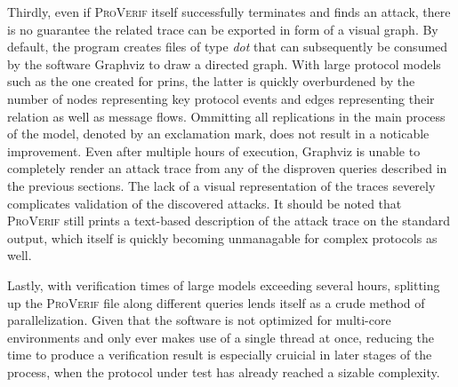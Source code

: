 Thirdly, even if \textsc{ProVerif} itself successfully terminates and finds an attack, there is no guarantee the related trace can be exported in form of a visual graph.
By default, the program creates files of type \textit{dot} that can subsequently be consumed by the software Graphviz to draw a directed graph.
With large protocol models such as the one created for \gls{prins}, the latter is quickly overburdened by the number of nodes representing key protocol events and edges representing their relation as well as message flows.
Ommitting all replications in the main process of the model, denoted by an exclamation mark, does not result in a noticable improvement.
Even after multiple hours of execution, Graphviz is unable to completely render an attack trace from any of the disproven queries described in the previous sections.
The lack of a visual representation of the traces severely complicates validation of the discovered attacks.
It should be noted that \textsc{ProVerif} still prints a text-based description of the attack trace on the standard output, which itself is quickly becoming unmanagable for complex protocols as well.\medskip

Lastly, with verification times of large models exceeding several hours, splitting up the \textsc{ProVerif} file along different queries lends itself as a crude method of parallelization.
Given that the software is not optimized for multi-core environments and only ever makes use of a single thread at once, reducing the time to produce a verification result is especially cruicial in later stages of the process, when the protocol under test has already reached a sizable complexity.